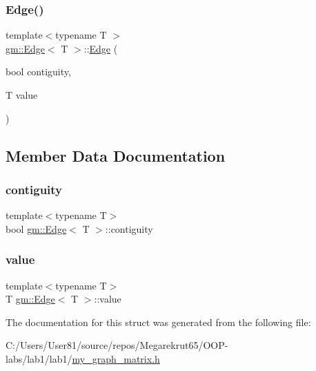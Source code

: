 \mbox{\label{structgm_1_1_edge_a32c86440a158bba7235181bd9e1c70a3}} 
\subsubsection{\texorpdfstring{Edge()}{Edge()}\hspace{0.1cm}{\footnotesize\ttfamily [2/2]}}
{\footnotesize\ttfamily template$<$typename T $>$ \\
\mbox{\hyperlink{structgm_1_1_edge}{gm\+::\+Edge}}$<$ T $>$\+::\mbox{\hyperlink{structgm_1_1_edge}{Edge}} (\begin{DoxyParamCaption}\item[{bool}]{contiguity,  }\item[{T}]{value }\end{DoxyParamCaption})}



\subsection{Member Data Documentation}
\mbox{\label{structgm_1_1_edge_ad9bbe3016236ffff899a0b982e96a6cd}} 
\subsubsection{\texorpdfstring{contiguity}{contiguity}}
{\footnotesize\ttfamily template$<$typename T$>$ \\
bool \mbox{\hyperlink{structgm_1_1_edge}{gm\+::\+Edge}}$<$ T $>$\+::contiguity}

\mbox{\label{structgm_1_1_edge_a45d07f827a6133ea2179fdbebe0867f1}} 
\subsubsection{\texorpdfstring{value}{value}}
{\footnotesize\ttfamily template$<$typename T$>$ \\
T \mbox{\hyperlink{structgm_1_1_edge}{gm\+::\+Edge}}$<$ T $>$\+::value}



The documentation for this struct was generated from the following file\+:\begin{DoxyCompactItemize}
\item 
C\+:/\+Users/\+User81/source/repos/\+Megarekrut65/\+O\+O\+P-\/labs/lab1/lab1/\mbox{\hyperlink{my__graph__matrix_8h}{my\+\_\+graph\+\_\+matrix.\+h}}\end{DoxyCompactItemize}
